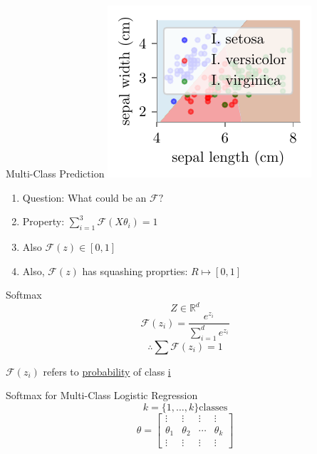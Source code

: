 \documentclass{beamer}
\begin{document}
\begin{frame}{Multi-Class Prediction}
\includegraphics[scale=0.8]{../assets/logistic-regression/figures/logisitic-iris-prediction.pdf}
\pause \begin{enumerate}
	\item Question: What could be an $\mathcal{F}?$
	\item Property: $\sum_{i=1}^{3}\mathcal{F}{({X\theta_i})} = 1$
	\item Also $\mathcal{F}(z)\in [0, 1]$
	\item Also, $\mathcal{F}(z)$ has squashing proprties: $R \mapsto [0, 1]$
\end{enumerate}


\end{frame}
\begin{frame}{Softmax}
\begin{equation*}
Z \in \mathbb{R}^{d}
\end{equation*}
\begin{equation*}
\mathcal{F}(z_{i}) = \frac{e^{z_{i}}}{\sum_{i=1}^{d}e^{z_{i}}}
\end{equation*}
\begin{equation*}
\therefore \sum \mathcal{F}(z_{i}) = 1
\end{equation*}

$\mathcal{F}(z_{i})$ refers to \underline{probability} of class \underline{i}
\end{frame}
\begin{frame}{Softmax for Multi-Class Logistic Regression}
\begin{equation*}
k = \{1, \ldots, k\} \text{classes}
\end{equation*}
$$
\theta=\left[\begin{array}{llll}
{\vdots} & {\vdots} & {\vdots} & {\vdots} \\
{\theta_{1}} & {\theta_{2}} & {\cdots} & {\theta_{k}} \\
{\vdots} & {\vdots} & {\vdots} & {\vdots} 	
\end{array}\right]
$$
\centering
{}
\end{frame}
\end{document}
